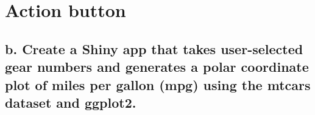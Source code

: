 \documentclass[
]{book}
\newenvironment{Shaded}{\begin{snugshade}}{\end{snugshade}}
\newcommand{\AttributeTok}[1]{\textcolor[rgb]{0.13,0.29,0.53}{#1}}
\newcommand{\CommentTok}[1]{\textcolor[rgb]{0.56,0.35,0.01}{\textit{#1}}}
\newcommand{\ControlFlowTok}[1]{\textcolor[rgb]{0.13,0.29,0.53}{\textbf{#1}}}
\newcommand{\DecValTok}[1]{\textcolor[rgb]{0.00,0.00,0.81}{#1}}
\newcommand{\FunctionTok}[1]{\textcolor[rgb]{0.13,0.29,0.53}{\textbf{#1}}}
\newcommand{\NormalTok}[1]{#1}
\newcommand{\OtherTok}[1]{\textcolor[rgb]{0.56,0.35,0.01}{#1}}
\newcommand{\SpecialCharTok}[1]{\textcolor[rgb]{0.81,0.36,0.00}{\textbf{#1}}}
\newcommand{\StringTok}[1]{\textcolor[rgb]{0.31,0.60,0.02}{#1}}
\begin{document}
\begin{Shaded}
\end{Shaded}

\hypertarget{action-button}{%
\section{Action button}\label{action-button}}

\hypertarget{b.-create-a-shiny-app-that-takes-user-selected-gear-numbers-and-generates-a-polar-coordinate-plot-of-miles-per-gallon-mpg-using-the-mtcars-dataset-and-ggplot2.}{%
\subsection{b. Create a Shiny app that takes user-selected gear numbers and generates a polar coordinate plot of miles per gallon (mpg) using the mtcars dataset and ggplot2.}\label{b.-create-a-shiny-app-that-takes-user-selected-gear-numbers-and-generates-a-polar-coordinate-plot-of-miles-per-gallon-mpg-using-the-mtcars-dataset-and-ggplot2.}}
\end{document}
